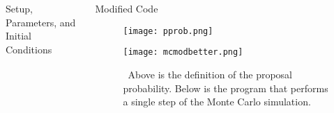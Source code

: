 \documentclass[final]{beamer}
\newlength{\onecolwid}
\newlength{\twocolwid}
\begin{document}
\begin{frame}[t]
\begin{columns}[t]
\begin{column}{\twocolwid}
\begin{columns}[t,totalwidth=\twocolwid]
\begin{column}{\onecolwid}
\begin{block}{Setup, Parameters, and Initial Conditions}
\end{block}


\end{column} %

\begin{column}{\onecolwid}\vspace{-.6in} %


\begin{block}{Modified Code}
\begin{figure}
\texttt{[image: pprob.png]}
\end{figure}

\begin{figure}
\texttt{[image: mcmodbetter.png]}
\caption{\ Above is the definition of the proposal probability. Below is the program that performs a single step of the Monte Carlo simulation.}
\end{figure}
\end{block}


\end{column} %

\end{columns} %








\end{column}
\end{columns}
\end{frame}
\end{document}

